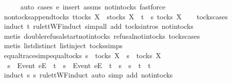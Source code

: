 \begin{isabellebody}
\ \ \ \ \isamarkupfalse%
\ {\isacharparenleft}auto{\isacharcomma}\ cases\ e{\isacharcomma}\ insert\ assms\ notin{\isacharunderscore}tocks{\isacharcomma}\ fastforce{\isacharplus}{\isacharparenright}\isanewline
{}\isamarkupfalse%
%
\endisatagproof
{\isafoldproof}%
%
\isadelimproof
\isanewline
%
\endisadelimproof
\isanewline
{}\isamarkupfalse%
\ nontocks{\isacharunderscore}append{\isacharunderscore}tocks{\isacharcolon}\ {\isachardoublequoteopen}t{\isasymnotin}tocks\ X\ {\isasymLongrightarrow}\ s{\isasymin}tocks\ X\ {\isasymLongrightarrow}\ t\ {\isacharat}\ s\ {\isasymnotin}tocks\ X{\isachardoublequoteclose}\isanewline
%
\isadelimproof
\ \ %
\endisadelimproof
%
\isatagproof
{}\isamarkupfalse%
\ tocks{\isachardot}cases\ \isamarkupfalse%
\ {\isacharparenleft}induct\ t\ rule{\isacharcolon}ttWF{\isachardot}induct{\isacharcomma}\ simp{\isacharunderscore}all\ add{\isacharcolon}\ tocks{\isachardot}intros\ notin{\isacharunderscore}tocks{\isacharparenright}\isanewline
\ \ \isamarkupfalse%
\ {\isacharparenleft}metis\ double{\isacharunderscore}refusal{\isacharunderscore}start{\isacharunderscore}notin{\isacharunderscore}tocks\ refusal{\isacharunderscore}notin{\isacharunderscore}tocks\ tocks{\isachardot}cases{\isacharparenright}\isanewline
\ \ \isamarkupfalse%
\ {\isacharparenleft}metis\ list{\isachardot}distinct{\isacharparenleft}{}{\isacharparenright}\ list{\isachardot}inject\ tocks{\isachardot}simps{\isacharparenright}%
\endisatagproof
{\isafoldproof}%
%
\isadelimproof
\isanewline
%
\endisadelimproof
\isanewline
{}\isamarkupfalse%
\ equal{\isacharunderscore}traces{\isacharunderscore}imp{\isacharunderscore}equal{\isacharunderscore}tocks{\isacharcolon}\ {\isachardoublequoteopen}s\ {\isasymin}\ tocks\ X\ {\isasymLongrightarrow}\ s{\isacharprime}\ {\isasymin}\ tocks\ X\ \ {\isasymLongrightarrow}\ \isanewline
\ \ s\ {\isacharat}\ {\isacharbrackleft}{\isacharbrackleft}Event\ e{\isacharbrackright}\isactrlsub E{\isacharbrackright}\ {\isacharat}\ t\ {\isacharequal}\ s{\isacharprime}\ {\isacharat}\ {\isacharbrackleft}{\isacharbrackleft}Event\ e{\isacharbrackright}\isactrlsub E{\isacharbrackright}\ {\isacharat}\ t{\isacharprime}\ {\isasymLongrightarrow}\ s\ {\isacharequal}\ s{\isacharprime}\ {\isasymand}\ t\ {\isacharequal}\ t{\isacharprime}{\isachardoublequoteclose}\isanewline
%
\isadelimproof
\ \ %
\endisadelimproof
%
\isatagproof
{}\isamarkupfalse%
\ {\isacharparenleft}induct\ s\ s{\isacharprime}\ rule{\isacharcolon}ttWF{}{\isachardot}induct{\isacharcomma}\ auto\ simp\ add{\isacharcolon}\ notin{\isacharunderscore}tocks{\isacharparenright}\isanewline

\end{isabellebody}
